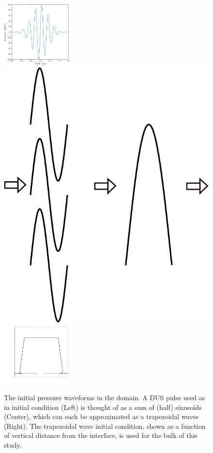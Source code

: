 \begin{figure}%
  \centering%
  \includegraphics[width=0.32\textwidth]{./figs/lung_figs/p0_vs_t_us}\hfill%
  \includegraphics[width=0.17\textheight]{./figs/lung_figs/wave_logic_schematic2}\hfill
  \includegraphics[width=0.32\textwidth]{./figs/lung_figs/p0_vs_y}%
  \caption[Trapezoidal and \ac{DUS} pulse waves]{The initial pressure
    waveforms in the domain. A \ac{DUS} pulse used as in initial
    condition (Left) is thought of as a sum of (half) sinusoids
    (Center), which can each be approximated as a trapezoidal waves
    (Right). The trapezoidal wave initial condition, shown as a function of
    vertical distance from the interface, is used for the bulk of this
    study.}%
  \label{fig:p0}
\end{figure}
%
